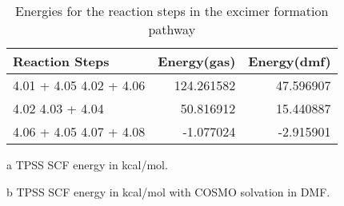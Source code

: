 \begin{table}[!htb]
\centering
 \begin{threeparttable}
  \caption{Energies for the reaction steps in the excimer formation pathway}
    \begin{tabular}{lrr}
    \toprule
    Reaction Steps & Energy(gas)\tnote{a} & Energy(dmf)\tnote{b} \\
    \midrule
    4.01 + 4.05 \ce{->} 4.02 + 4.06   & 124.261582 & 47.596907 \\
    4.02 \ce{->} 4.03 + 4.04 & 50.816912 & 15.440887 \\
    4.06 + 4.05 \ce{->} 4.07 + 4.08 & -1.077024 & -2.915901 \\
    \bottomrule
    \end{tabular}%
    \begin{tablenotes}
    \item [a] TPSS SCF energy in kcal/mol.
    \item [b] TPSS SCF energy in kcal/mol with COSMO solvation in DMF.
    \end{tablenotes}
  \label{tab.suprxn}%
 \end{threeparttable}
\end{table}%



